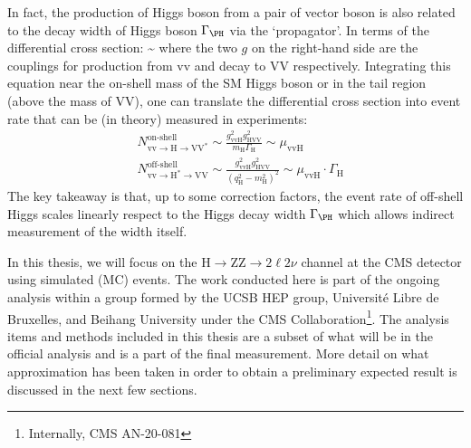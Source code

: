 In fact, the production of Higgs boson from a pair of vector boson is also related to the
decay width of Higgs boson $\Gamma_\text{\PH}$ via the `propagator'\cite{offshell_poc}. In terms of the
differential cross section:
\be
\label{eqn:diff_xsec}
\sim 
{}
\ee
where the two $g$ on the right-hand side are the couplings for production from vv and decay
to VV respectively. Integrating this equation near the on-shell mass of the SM Higgs boson 
or in the tail region (above the mass of VV), one can translate the differential cross section
into event rate that can be (in theory) measured in experiments:
\begin{equation}
\begin{split}
&N_{\mathrm{vv} \rightarrow \mathrm{H} \rightarrow \mathrm{VV}^{*}}^{\text{on-shell}} \sim \frac{g_{\mathrm{vvH}}^{2} g_{\mathrm{HVV}}^{2}}{m_{\mathrm{H}} \Gamma_{\mathrm{H}}} \sim \mu_{\mathrm{vvH}}
\\
&N_{\mathrm{vv} \rightarrow \mathrm{H}^{*} \rightarrow \mathrm{VV}}^{\text{off-shell}} \sim \frac{g_{\mathrm{vvH}}^{2} g_{\mathrm{HVV}}^{2}}{\left(q_{\mathrm{H}}^{2}-m_{\mathrm{H}}^{2}\right)^{2}} \sim \mu_{\mathrm{vvH}} \cdot \Gamma_{\mathrm{H}}
\end{split}
\end{equation}
The key takeaway is that, up to some correction factors, the event rate of off-shell Higgs scales
linearly respect to the Higgs decay width $\Gamma_\text{\PH}$ which allows indirect
measurement of the width itself.

In this thesis, we will focus on the $\mathrm{H} \rightarrow \mathrm{ZZ} \rightarrow 2\ell2\nu$ channel
at the CMS detector using simulated (MC) events. The work conducted here is part of the ongoing analysis
within a group formed by the UCSB HEP group, Universit\'e Libre de Bruxelles, and Beihang University under
the CMS Collaboration\footnote{Internally, CMS AN-20-081}. The analysis items and methods included in this
thesis are a subset of what will be in the official analysis and is a part of the final measurement. More
detail on what approximation has been taken in order to obtain a preliminary expected result is discussed
in the next few sections.



